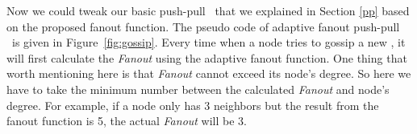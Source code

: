 Now we could tweak our basic push-pull \gp ~that we explained in Section \ref{pp} based on the proposed fanout function. The pseudo code of adaptive fanout push-pull \gp ~is given in Figure~\ref{fig:gossip}. Every time when a node tries to gossip a new \msg, it will first calculate the \emph{Fanout} using the adaptive fanout function. One thing that worth mentioning here is that \emph{Fanout} cannot exceed its node's degree. So here we have to take the minimum number between the calculated \emph{Fanout} and node's degree. For example, if a node only has 3 neighbors but the result from the fanout function is 5, the actual \emph{Fanout} will be 3.
